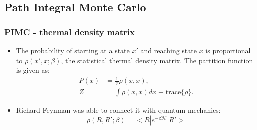 \documentclass[xcolor=svgnames]{beamer}
\DeclareRobustCommand{\mc}[1]{\mathcal{#1}}
\begin{document}
	\subsection{Path Integral Monte Carlo}
        \begin{frame}
            \frametitle{PIMC - thermal density matrix}
            \begin{itemize}
                \justifying
                \item The probability of starting at a state $x'$ and reaching state $x$ is proportional to $\rho (x', x; \beta)$, the statistical thermal density matrix. The partition function is given as: 
                \begin{equation*}
                    \begin{aligned}
                        P(x) &= \frac{1}{Z} \rho(x,x),\\
                        Z &= \int \rho(x,x) dx \equiv \text{trace} \{\rho\}.
                    \end{aligned}
                \end{equation*}
                \item Richard Feynman was able to connect it with quantum mechanics:
                \begin{equation*}\label{eq:rho}
                    \rho (R , R' ; \beta) = < R | e^{- \beta \mc{H} } | R' >
                \end{equation*}
            \end{itemize}
        \end{frame}
\end{document}
